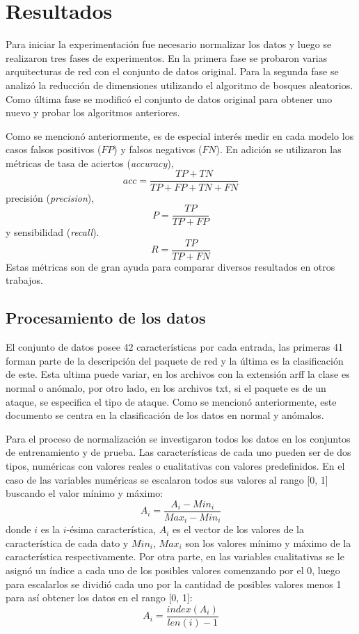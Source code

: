 \chapter{Resultados}\label{chapter:results}

Para iniciar la experimentación fue necesario normalizar los datos y luego se realizaron tres fases de experimentos. En la primera fase se probaron varias arquitecturas de red con el conjunto de datos original. Para la segunda fase se analizó la reducción de dimensiones utilizando el algoritmo de bosques aleatorios. Como última fase se modificó el conjunto de datos original para obtener uno nuevo y probar los algoritmos anteriores.

Como se mencionó anteriormente, es de especial interés medir en cada modelo los casos falsos positivos ($FP$) y falsos negativos ($FN$). En adición se utilizaron las métricas de tasa de aciertos (\textit{accuracy}), 
\[acc = \frac{TP + TN}{TP + FP + TN + FN}\] 
precisión \cite{salton1983introduction} (\textit{precision}), 
\[P = \frac{TP}{TP + FP}\]
 y sensibilidad \cite{allen1955machine} (\textit{recall}). 
\[R = \frac{TP}{TP + FN}\]
Estas métricas son de gran ayuda para comparar diversos resultados en otros trabajos.

\section{Procesamiento de los datos}
El conjunto de datos posee 42 características por cada entrada, las primeras 41 forman parte de la descripción del paquete de red y la última es la clasificación de este. Esta ultima puede variar, en los archivos con la extensión arff la clase es normal o anómalo, por otro lado, en los archivos txt, si el paquete es de un ataque, se especifica el tipo de ataque. Como se mencionó anteriormente, este documento se centra en la clasificación de los datos en normal y anómalos.

Para el proceso de normalización se investigaron todos los datos en los conjuntos de entrenamiento y de prueba. Las características de cada uno pueden ser de dos tipos, numéricas con valores reales o cualitativas con valores predefinidos. En el caso de las variables numéricas se escalaron todos sus valores al rango [0, 1] buscando el valor mínimo y máximo:
\[A_{i} = \frac{A_{i} - Min_{i}}{Max_{i} - Min_{i}}\] 
donde $i$ es la $i$-\'esima característica, $A_{i}$ es el vector de los valores de la característica de cada dato y $Min_{i}$, $Max_{i}$ son los valores mínimo y máximo de la característica respectivamente. Por otra parte, en las variables cualitativas se le asignó un índice a cada uno de los posibles valores comenzando por el 0, luego para escalarlos se dividió cada uno por la cantidad de posibles valores menos 1 para así obtener los datos en el rango [0, 1]:
\[A_{i} = \frac{index(A_{i})}{len(i) - 1}\]

